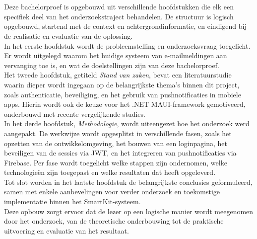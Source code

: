 \section{}%
\label{sec:opzet-bachelorproef}

Deze bachelorproef is opgebouwd uit verschillende hoofdstukken die elk een specifiek deel van het onderzoekstraject behandelen. De structuur is logisch opgebouwd, startend met de context en achtergrondinformatie, en eindigend bij de realisatie en evaluatie van de oplossing.\\

In het eerste hoofdstuk wordt de probleemstelling en onderzoeksvraag toegelicht. Er wordt uitgelegd waarom het huidige systeem van e-mailmeldingen aan vervanging toe is, en wat de doelstellingen zijn van deze bachelorproef.\\

Het tweede hoofdstuk, getiteld \emph{Stand van zaken}, bevat een literatuurstudie waarin dieper wordt ingegaan op de belangrijkste thema’s binnen dit project, zoals authenticatie, beveiliging, en het gebruik van pushnotificaties in mobiele apps. Hierin wordt ook de keuze voor het .NET MAUI-framework gemotiveerd, onderbouwd met recente vergelijkende studies.\\

In het derde hoofdstuk, \emph{Methodologie}, wordt uiteengezet hoe het onderzoek werd aangepakt. De werkwijze wordt opgesplitst in verschillende fasen, zoals het opzetten van de ontwikkelomgeving, het bouwen van een loginpagina, het beveiligen van de sessies via JWT, en het integreren van pushnotificaties via Firebase. Per fase wordt toegelicht welke stappen zijn ondernomen, welke technologieën zijn toegepast en welke resultaten dat heeft opgeleverd.\\

Tot slot worden in het laatste hoofdstuk de belangrijkste conclusies geformuleerd, samen met enkele aanbevelingen voor verder onderzoek en toekomstige implementatie binnen het SmartKit-systeem.\\

Deze opbouw zorgt ervoor dat de lezer op een logische manier wordt meegenomen door het onderzoek, van de theoretische onderbouwing tot de praktische uitvoering en evaluatie van het resultaat.

